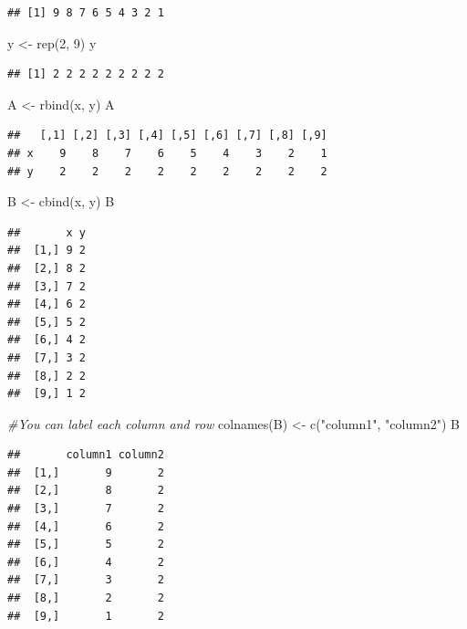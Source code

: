 \documentclass[
]{book}
\newenvironment{Shaded}{\begin{snugshade}}{\end{snugshade}}
\newcommand{\CommentTok}[1]{\textcolor[rgb]{0.56,0.35,0.01}{\textit{#1}}}
\newcommand{\DecValTok}[1]{\textcolor[rgb]{0.00,0.00,0.81}{#1}}
\newcommand{\FunctionTok}[1]{\textcolor[rgb]{0.00,0.00,0.00}{#1}}
\newcommand{\NormalTok}[1]{#1}
\newcommand{\OtherTok}[1]{\textcolor[rgb]{0.56,0.35,0.01}{#1}}
\newcommand{\StringTok}[1]{\textcolor[rgb]{0.31,0.60,0.02}{#1}}
\begin{document}
\begin{verbatim}
## [1] 9 8 7 6 5 4 3 2 1
\end{verbatim}

\begin{Shaded}
\begin{Highlighting}[]
\NormalTok{y }\OtherTok{\textless{}{-}} \FunctionTok{rep}\NormalTok{(}\DecValTok{2}\NormalTok{, }\DecValTok{9}\NormalTok{)}
\NormalTok{y}
\end{Highlighting}
\end{Shaded}

\begin{verbatim}
## [1] 2 2 2 2 2 2 2 2 2
\end{verbatim}

\begin{Shaded}
\begin{Highlighting}[]
\NormalTok{A }\OtherTok{\textless{}{-}} \FunctionTok{rbind}\NormalTok{(x, y)}
\NormalTok{A}
\end{Highlighting}
\end{Shaded}

\begin{verbatim}
##   [,1] [,2] [,3] [,4] [,5] [,6] [,7] [,8] [,9]
## x    9    8    7    6    5    4    3    2    1
## y    2    2    2    2    2    2    2    2    2
\end{verbatim}

\begin{Shaded}
\begin{Highlighting}[]
\NormalTok{B }\OtherTok{\textless{}{-}} \FunctionTok{cbind}\NormalTok{(x, y)}
\NormalTok{B}
\end{Highlighting}
\end{Shaded}

\begin{verbatim}
##       x y
##  [1,] 9 2
##  [2,] 8 2
##  [3,] 7 2
##  [4,] 6 2
##  [5,] 5 2
##  [6,] 4 2
##  [7,] 3 2
##  [8,] 2 2
##  [9,] 1 2
\end{verbatim}

\begin{Shaded}
\begin{Highlighting}[]
\CommentTok{\#You can label each column and row}
\FunctionTok{colnames}\NormalTok{(B) }\OtherTok{\textless{}{-}} \FunctionTok{c}\NormalTok{(}\StringTok{"column1"}\NormalTok{, }\StringTok{"column2"}\NormalTok{)}
\NormalTok{B}
\end{Highlighting}
\end{Shaded}

\begin{verbatim}
##       column1 column2
##  [1,]       9       2
##  [2,]       8       2
##  [3,]       7       2
##  [4,]       6       2
##  [5,]       5       2
##  [6,]       4       2
##  [7,]       3       2
##  [8,]       2       2
##  [9,]       1       2
\end{verbatim}
\end{document}
